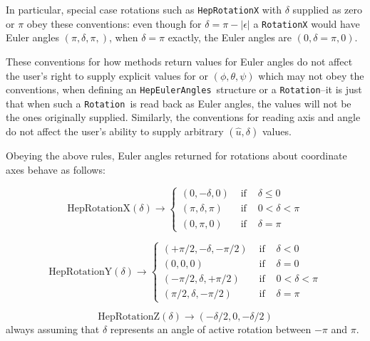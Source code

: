 \documentclass[twoside,12pt]{article}
\def \Rotation {{\tt Rotation}}
\def \Es {{\tt HepEulerAngles}}
\begin{document}
In particular, special case rotations such as
{\tt HepRotationX} with $\delta$ supplied as zero or $\pi$
obey these conventions:  even though for $\delta = \pi - |\epsilon|$
a {\tt RotationX} would have Euler angles $( \pi, \delta, \pi, )$,
when $\delta = \pi$ exactly, the Euler angles are $(0, \delta=\pi, 0)$.

These conventions for how methods return values for Euler angles
do not affect the user's right to supply explicit values for
or $ ( \phi, \theta, \psi ) $ which may not obey the conventions,
when defining an \Es\ structure or a \Rotation--it is just that when
such a \Rotation\ is read back as Euler angles, the values will not be
the ones originally supplied.
Similarly, the conventions for reading axis and angle do not affect the
user's ability to supply arbitrary $ ( \hat{u}, \delta) $ values.

Obeying the above rules, Euler angles returned for
rotations about coordinate axes behave as follows:

\begin{equation}
\mbox{HepRotationX}(\delta) \longrightarrow
\left\{
\begin{array}{ccc}
( 0, -\delta, 0 ) & \mbox{ if } & \delta \leq 0 \\
( \pi, \delta, \pi ) & \mbox{ if } & 0 < \delta < \pi \\
( 0, \pi, 0 ) & \mbox{ if } & \delta = \pi
\end{array}
\right.
	\label{eq:rotXconv}
\end{equation}

\begin{equation}
\mbox{HepRotationY}(\delta) \longrightarrow
\left\{
\begin{array}{ccc}
( +\pi/2, -\delta, -\pi/2 ) & \mbox{ if } & \delta <  0 \\
( 0, 0, 0) & \mbox{ if } & \delta = 0 \\
( -\pi/2, \delta, +\pi/2 ) & \mbox{ if } & 0 <  \delta < \pi \\
( \pi/2, \delta, -\pi/2 ) & \mbox{ if } & \delta = \pi
\end{array}
\right.
	\label{eq:rotYconv}
\end{equation}

\begin{equation}
\mbox{HepRotationZ}(\delta) \longrightarrow ( -\delta/2, 0, -\delta/2 )
	\label{eq:rotZconv}
\end{equation}
\noindent always assuming that $\delta$ represents an angle of active rotation
between $-\pi$ and $\pi$.
\end{document}
